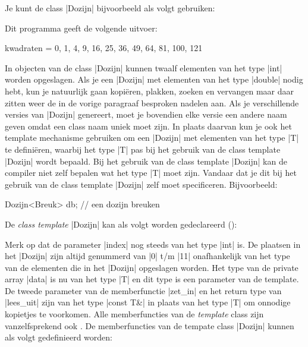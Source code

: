 \begin{cpplstShortInline}
Je kunt de class |Dozijn| bijvoorbeeld als volgt gebruiken:

Dit programma geeft de volgende uitvoer:
\begin{coutput}
kwadraten = 0, 1, 4, 9, 16, 25, 36, 49, 64, 81, 100, 121
\end{coutput}

In objecten van de class |Dozijn| kunnen twaalf elementen van het type |int| worden opgeslagen.
Als je een |Dozijn| met elementen van het type |double| nodig hebt, kun je natuurlijk gaan kopiëren, plakken, zoeken en vervangen maar daar zitten weer de in de vorige paragraaf besproken nadelen aan.
Als je verschillende versies van |Dozijn|  genereert, moet je bovendien elke versie een andere naam geven omdat een class naam uniek moet zijn. 
In plaats daarvan kun je ook het template mechanisme gebruiken om een |Dozijn| met elementen van het type |T| te definiëren, waarbij het type |T| pas bij het gebruik van de class template |Dozijn| wordt bepaald.
Bij het gebruik van de class template |Dozijn| kan de compiler niet zelf bepalen wat het type |T| moet zijn.
Vandaar dat je dit bij het gebruik van de class template |Dozijn| zelf moet specificeren.
Bijvoorbeeld:
\begin{cpplstfragment}
Dozijn<Breuk> db; // een dozijn breuken
\end{cpplstfragment}

\label{sec:class_template_Dozijn}
De \emph{class template} |Dozijn| kan als volgt worden gedeclareerd ():

Merk op dat de parameter |index| nog steeds van het type |int| is.
De plaatsen in het |Dozijn| zijn altijd genummerd van |0| t/m |11| onafhankelijk van het type van de elementen die in het |Dozijn| opgeslagen worden.
Het type van de private array |data| is nu van het type |T| en dit type is een parameter van de template.
De tweede parameter van de memberfunctie |zet_in| en het return type van |lees_uit| zijn van het type |const T&| in plaats van het type |T| om onnodige kopietjes te voorkomen.
Alle memberfuncties van de \emph{template} class zijn vanzelfsprekend ook \emph{}.
De memberfuncties van de tempate class |Dozijn| kunnen als volgt gedefinieerd worden:


\end{cpplstShortInline}
